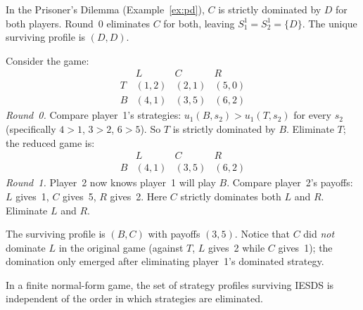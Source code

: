 \documentclass[11pt,a4paper]{article}
\begin{document}
\begin{example}
\label{ex:pd_iesds}
In the Prisoner's Dilemma (Example~\ref{ex:pd}), $C$ is strictly dominated
by $D$ for both players.  Round~0 eliminates $C$ for both, leaving
$S_1^1 = S_2^1 = \{D\}$.  The unique surviving profile is $(D, D)$.
\end{example}

\begin{example}
\label{ex:iesds_multi}
Consider the game:
\[
\begin{array}{c|ccc}
    & L & C & R \\ \hline
  T & (1,2) & (2,1) & (5,0) \\
  B & (4,1) & (3,5) & (6,2)
\end{array}
\]
\emph{Round~0.}  Compare player~1's strategies: $u_1(B, s_2) > u_1(T, s_2)$
for every $s_2$ (specifically $4 > 1$, $3 > 2$, $6 > 5$).  So $T$ is
strictly dominated by $B$.  Eliminate $T$; the reduced game is:
\[
\begin{array}{c|ccc}
    & L & C & R \\ \hline
  B & (4,1) & (3,5) & (6,2)
\end{array}
\]
\emph{Round~1.}  Player~2 now knows player~1 will play $B$.  Compare
player~2's payoffs: $L$ gives~1, $C$ gives~5, $R$ gives~2.  Here $C$
strictly dominates both $L$ and $R$.  Eliminate $L$ and $R$.

The surviving profile is $(B, C)$ with payoffs $(3, 5)$.  Notice that $C$
did \emph{not} dominate $L$ in the original game (against $T$, $L$
gives~2 while $C$ gives~1); the domination only emerged after eliminating
player~1's dominated strategy.
\end{example}

\begin{theorem}
\label{thm:iesds_order}
In a finite normal-form game, the set of strategy profiles surviving IESDS
is independent of the order in which strategies are eliminated.
\end{theorem}
\end{document}
